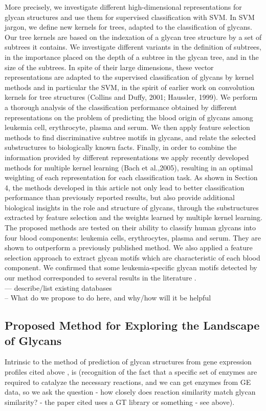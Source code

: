 \documentclass[12pt,a4paper]{article}
\begin{document}
More precisely, we investigate different high-dimensional representations for glycan structures and use them for supervised classification with SVM. In SVM jargon, we define new kernels for trees, adapted to the classification of glycans. Our tree kernels are based on the indexation of a glycan tree structure by a set of subtrees it contains. We investigate different variants in the definition of subtrees, in the importance placed on the depth of a subtree in the glycan tree, and in the size of the subtrees. In spite of their large dimensions, these vector representations are adapted to the supervised classification of glycans by kernel methods and in particular the SVM, in the spirit of earlier work on convolution kernels for tree structures (Collins and Duffy, 2001; Haussler, 1999). We perform a thorough analysis of the classification performance obtained by different representations on the problem of predicting the blood origin of glycans among leukemia cell, erythrocyte, plasma and serum. We then apply feature selection methods to find discriminative subtree motifs in glycans, and relate the selected substructures to biologically known facts. Finally, in order to combine the information provided by different representations we apply recently developed methods for multiple kernel learning (Bach et al.,2005), resulting in an optimal weighting of each representation for each classification task. As shown in Section 4, the methods developed in this article not only lead to better classification performance than previously reported results, but also provide additional biological insights in the role and structure of glycans, through the substructures extracted by feature selection and the weights learned by multiple kernel learning. The proposed methods are tested on their ability to classify human glycans into four blood components: leukemia cells, erythrocytes, plasma and serum. They are shown to outperform a previously published method. We also applied a feature selection approach to extract glycan motifs which are characteristic of each blood component. We confirmed that some leukemia-specific glycan motifs detected by our method corresponded to several results in the literature \citep{doi:10.1093/bioinformatics/btm090}.\\

--- describe/list existing databases\\


-- What do we propose to do here, and why/how will it be helpful\\
\subsection{Proposed Method for Exploring the Landscape of Glycans}
\label{sec:proposed_method}
Intrinsic to the method of prediction of glycan structures from gene expression profiles cited above \citep{doi:10.1093/bioinformatics/bti666}, is (recognition of the fact that a specific set of enzymes are required to catalyze the necessary reactions, and we can get enzymes from GE data, so we ask the question - how closely does reaction similarity match glycan similarity? - the paper cited uses a GT library or something - see above).
\end{document}
